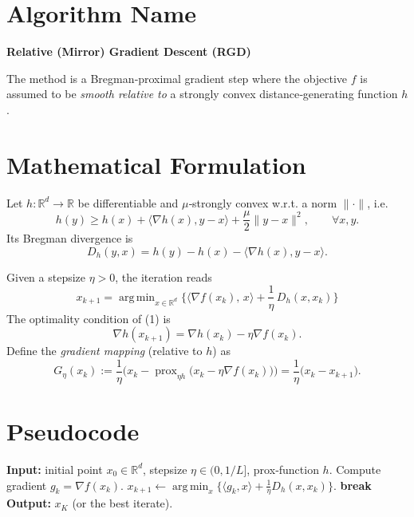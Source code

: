 \documentclass{article}
\newcommand{\argmin}{\mathop{\mathrm{arg\,min}}}
\newcommand{\grad}{\nabla}
\newcommand{\Breg}{D_{h}}
\newcommand{\prox}{\operatorname{prox}}
\begin{document}
\section*{Algorithm Name}
\textbf{Relative (Mirror) Gradient Descent (RGD)}  

The method is a Bregman‑proximal gradient step where the objective $f$ is assumed to be \emph{smooth relative to} a strongly convex distance‑generating function $h$.

\section*{Mathematical Formulation}
Let $h:\mathbb R^{d}\to\mathbb R$ be differentiable and $\mu$‑strongly convex w.r.t. a norm $\|\cdot\|$, i.e.  
\[
h(y)\ge h(x)+\langle \grad h(x),y-x\rangle+\frac{\mu}{2}\|y-x\|^{2},
\qquad\forall x,y.
\]
Its Bregman divergence is  
\[
\Breg (y,x)=h(y)-h(x)-\langle \grad h(x),y-x\rangle .
\]

Given a stepsize $\eta>0$, the iteration reads
\begin{equation}
\boxed{
x_{k+1}= \argmin_{x\in\mathbb R^{d}}
\Big\{ \langle \grad f(x_k),\,x\rangle+\frac{1}{\eta}\,\Breg (x,x_k) \Big\}
}\tag{1}
\end{equation}
The optimality condition of (1) is
\begin{equation}
\grad h(x_{k+1}) = \grad h(x_k)-\eta \grad f(x_k). \tag{2}
\end{equation}
Define the \emph{gradient mapping} (relative to $h$) as
\begin{equation}
G_{\eta}(x_k):=\frac{1}{\eta}\bigl(x_k-\prox_{\eta h}\bigl(x_k-\eta\grad f(x_k)\bigr)\bigr)
               =\frac{1}{\eta}\bigl(x_k-x_{k+1}\bigr). \tag{3}
\end{equation}

\section*{Pseudocode}
\begin{algorithm}[H]
\caption{Relative Gradient Descent (RGD)}\label{alg:RGD}
\begin{algorithmic}[1]
\STATE \textbf{Input:} initial point $x_0\in\mathbb R^{d}$, stepsize $\eta\in(0,1/L]$, prox‑function $h$.
\STATE Compute gradient $g_k=\grad f(x_k)$.
\STATE $x_{k+1}\gets\argmin_{x}\Big\{\langle g_k,x\rangle+\frac{1}{\eta}\Breg(x,x_k)\Big\}$.
\STATE \textbf{break}
\ENDIF
\ENDFOR
\STATE \textbf{Output:} $x_{K}$ (or the best iterate).
\end{algorithmic}
\end{algorithm}
\end{document}
